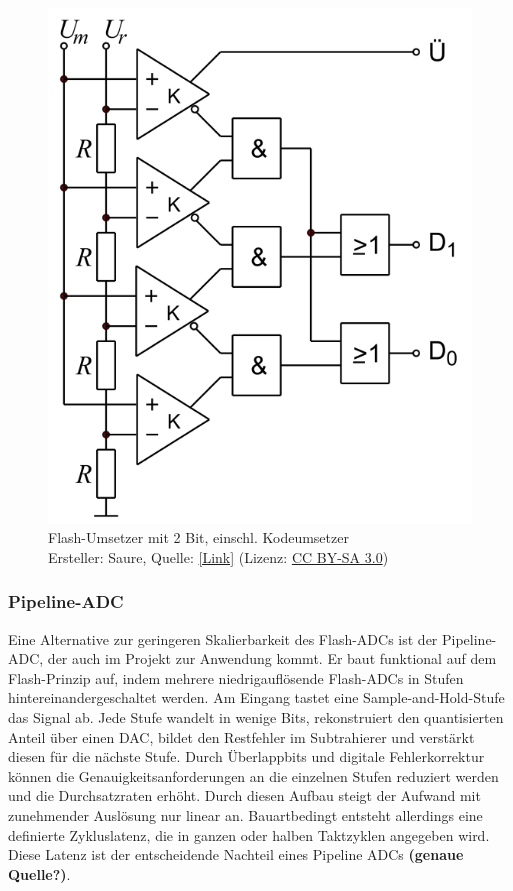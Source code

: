 \documentclass[a4paper, portrait, 12pt]{scrartcl} %
\begin{document}
\begin{figure}[H]
	\centering
		\includegraphics[scale=0.3]{DMT_ADU-2-Bit-Flash.png} 
		\caption{\centering  Flash-Umsetzer mit 2 Bit, einschl. Kodeumsetzer\\
		\footnotesize Ersteller: Saure, Quelle: \href{https://de.wikipedia.org/wiki/Datei:DMT_ADU-2-Bit-Flash.svg}{[Link]} (Lizenz: \href{https://creativecommons.org/licenses/by-sa/3.0/}{CC BY-SA 3.0})
		}
	\label{fig:2bit_flash_adc}
\end{figure}

\subsubsection{Pipeline-ADC}
Eine Alternative zur geringeren Skalierbarkeit des Flash-ADCs ist der Pipeline-ADC, der auch im Projekt zur Anwendung kommt. Er baut funktional auf dem Flash-Prinzip auf, indem mehrere niedrigauflösende Flash-ADCs in Stufen hintereinandergeschaltet werden. Am Eingang tastet eine Sample-and-Hold-Stufe das Signal ab. Jede Stufe wandelt in wenige Bits, rekonstruiert den quantisierten Anteil über einen DAC, bildet den Restfehler im Subtrahierer und verstärkt diesen für die nächste Stufe. Durch Überlappbits und digitale Fehlerkorrektur können die Genauigkeitsanforderungen an die einzelnen Stufen reduziert werden und die Durchsatzraten erhöht. Durch diesen Aufbau steigt der Aufwand mit zunehmender Auslösung nur linear an. Bauartbedingt entsteht allerdings eine definierte Zykluslatenz, die in ganzen oder halben Taktzyklen angegeben wird. Diese Latenz ist der entscheidende Nachteil eines Pipeline ADCs \textbf{(genaue Quelle?)}.
\end{document}
